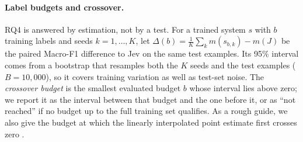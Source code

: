 \paragraph{Label budgets and crossover.}
RQ4 is answered by estimation, not by a test. For a trained system $s$ with $b$ training labels and seeds
$k=1,\dots,K$, let $\Delta(b)=\frac{1}{K}\sum_{k}m(s_{b,k})-m(J)$ be the paired Macro-F1 difference to Jev on the same
test examples. Its 95\% interval comes from a bootstrap that resamples both the $K$ seeds and the test examples
($B=10{,}000$), so it covers training variation as well as test-set noise. The \emph{crossover budget} is the smallest
evaluated budget $b$ whose interval lies above zero; we report it as the interval between that budget and the one before
it, or as ``not reached'' if no budget up to the full training set qualifies. As a rough guide, we also give the budget
at which the linearly interpolated point estimate first crosses zero \citep{lescao2021howmany}.
